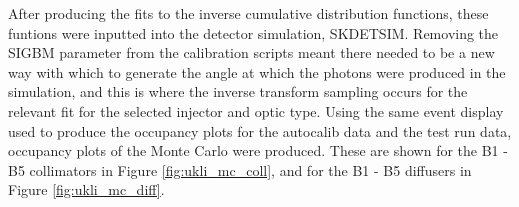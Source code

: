 \begin{figure}[!htbp]
    
\end{figure}

After producing the fits to the inverse cumulative distribution functions, these funtions were inputted into the detector simulation, SKDETSIM. Removing the SIGBM parameter from the calibration scripts meant there needed to be a new way with which to generate the angle at which the photons were produced in the simulation, and this is where the inverse transform sampling occurs for the relevant fit for the selected injector and optic type. Using the same event display used to produce the occupancy plots for the autocalib data and the test run data, occupancy plots of the Monte Carlo were produced. These are shown for the B1 - B5 collimators in Figure \ref{fig:ukli_mc_coll}, and for the B1 - B5 diffusers in Figure \ref{fig:ukli_mc_diff}. 

